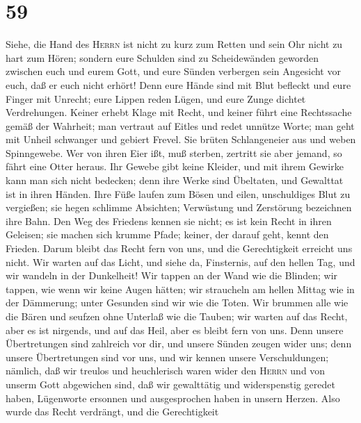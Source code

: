 \hypertarget{section-58}{%
\section{59}\label{section-58}}

 Siehe, die Hand des \textsc{Herrn} ist nicht zu kurz zum
Retten und sein Ohr nicht zu hart zum Hören;  sondern eure
Schulden sind zu Scheidewänden geworden zwischen euch und eurem Gott,
und eure Sünden verbergen sein Angesicht vor euch, daß er euch nicht
erhört!  Denn eure Hände sind mit Blut befleckt und eure
Finger mit Unrecht; eure Lippen reden Lügen, und eure Zunge dichtet
Verdrehungen.  Keiner erhebt Klage mit Recht, und keiner
führt eine Rechtssache gemäß der Wahrheit; man vertraut auf Eitles und
redet unnütze Worte; man geht mit Unheil schwanger und gebiert Frevel.
 Sie brüten Schlangeneier aus und weben Spinngewebe. Wer
von ihren Eier ißt, muß sterben, zertritt sie aber jemand, so fährt eine
Otter heraus.  Ihr Gewebe gibt keine Kleider, und mit
ihrem Gewirke kann man sich nicht bedecken; denn ihre Werke sind
Übeltaten, und Gewalttat ist in ihren Händen.  Ihre Füße
laufen zum Bösen und eilen, unschuldiges Blut zu vergießen; sie hegen
schlimme Absichten; Verwüstung und Zerstörung bezeichnen ihre Bahn.
 Den Weg des Friedens kennen sie nicht; es ist kein Recht
in ihren Geleisen; sie machen sich krumme Pfade; keiner, der darauf
geht, kennt den Frieden.  Darum bleibt das Recht fern von
uns, und die Gerechtigkeit erreicht uns nicht. Wir warten auf das Licht,
und siehe da, Finsternis, auf den hellen Tag, und wir wandeln in der
Dunkelheit!  Wir tappen an der Wand wie die Blinden; wir
tappen, wie wenn wir keine Augen hätten; wir straucheln am hellen Mittag
wie in der Dämmerung; unter Gesunden sind wir wie die Toten.
 Wir brummen alle wie die Bären und seufzen ohne Unterlaß
wie die Tauben; wir warten auf das Recht, aber es ist nirgends, und auf
das Heil, aber es bleibt fern von uns.  Denn unsere
Übertretungen sind zahlreich vor dir, und unsere Sünden zeugen wider
uns; denn unsere Übertretungen sind vor uns, und wir kennen unsere
Verschuldungen;  nämlich, daß wir treulos und
heuchlerisch waren wider den \textsc{Herrn} und von unserm Gott
abgewichen sind, daß wir gewalttätig und widerspenstig geredet haben,
Lügenworte ersonnen und ausgesprochen haben in unsern Herzen.
 Also wurde das Recht verdrängt, und die Gerechtigkeit
